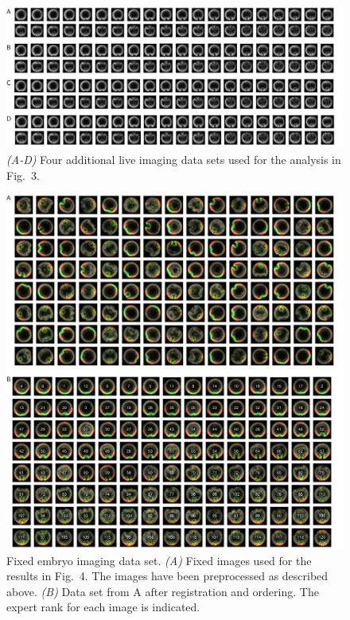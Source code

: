 \documentclass{pnastwo}
\newcommand{\fig}[0]{Fig.}
\begin{document}
\begin{figure}
\includegraphics{figS5}
\caption{{\it (A-D)} Four additional live imaging data sets used for the analysis in \fig~3. }
\end{figure}

\begin{figure}	
\includegraphics{figS6}
\caption{Fixed embryo imaging data set. {\it (A)} Fixed images used for the results in \fig~4. The images have been preprocessed as described above. {\it (B)} Data set from A after registration and ordering. The expert rank for each image is indicated. }
\end{figure}
\end{document}
